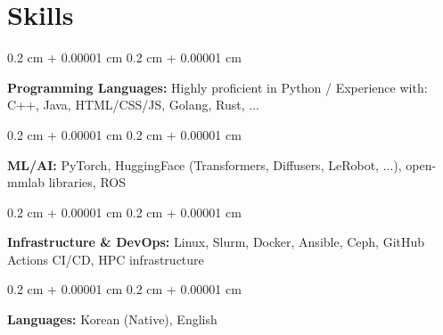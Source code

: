 \documentclass[10pt, letterpaper]{article}
\newenvironment{highlights}{
    \begin{itemize}[
        topsep=0.10 cm,
        parsep=0.10 cm,
        partopsep=0pt,
        itemsep=0pt,
        leftmargin=0.4 cm + 10pt
    ]
}{
    \end{itemize}
} %
\newenvironment{onecolentry}{
    \begin{adjustwidth}{
        0.2 cm + 0.00001 cm
    }{
        0.2 cm + 0.00001 cm
    }
}{
    \end{adjustwidth}
} %
\newenvironment{twocolentry}[2][]{
    \onecolentry
    \def\secondColumn{#2}
    \setcolumnwidth{\fill, 4.5 cm}
    \begin{paracol}{2}
}{
    \switchcolumn \raggedleft \secondColumn
    \end{paracol}
    \endonecolentry
} %
\let\hrefWithoutArrow\href
\renewcommand{\href}[2]{\hrefWithoutArrow{#1}{\ifthenelse{\equal{#2}{}}{ }{#2 }\raisebox{.15ex}{\footnotesize \faExternalLink*}}}
\begin{document}



\section{Skills}

\begin{onecolentry}
    \textbf{Programming Languages:} Highly proficient in Python / Experience with: C++, Java, HTML/CSS/JS, Golang, Rust, ...
\end{onecolentry}

\vspace{0.1 cm}

\begin{onecolentry}
    \textbf{ML/AI:} PyTorch, HuggingFace (Transformers, Diffusers, LeRobot, ...), open-mmlab libraries, ROS
\end{onecolentry}

\vspace{0.1 cm}

\begin{onecolentry}
    \textbf{Infrastructure \& DevOps:} Linux, Slurm, Docker, Ansible, Ceph, GitHub Actions CI/CD, HPC infrastructure
\end{onecolentry}

\vspace{0.1 cm}

\begin{onecolentry}
    \textbf{Languages:} Korean (Native), English
\end{onecolentry}
\end{document}
